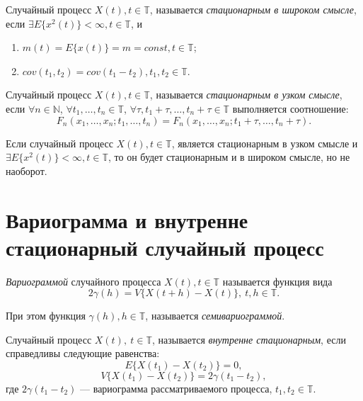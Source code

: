 \begin{Definition}
	Случайный процесс $ X (t), t \in \mathbb{T} $, называется \textit{стационарным в широком смысле}, если $ \exists E \{ x^2(t) \} < \infty, t \in \mathbb{T} $, и
	\begin{enumerate}
		\item $ m(t) = E \{ x(t) \} = m = const, t \in \mathbb{T} $;
		\item $ cov(t_1, t_2) = cov(t_1 - t_2), t_1,t_2 \in \mathbb{T} $.
	\end{enumerate}
\end{Definition}

\begin{Definition}
	Случайный процесс $ X(t), t \in \mathbb{T} $, называется \textit{стационарным в узком смысле}, если $ \forall n \in \mathbb{N} $, $ \forall t_1, \dots, t_n \in \mathbb{T} $, $ \forall \tau, t_1 + \tau, \dots, t_n + \tau \in \mathbb{T} $ выполняется соотношение:
	\begin{equation*}
		F_n(x_1, \dots, x_n; t_1, \dots, t_n) = F_n(x_1, \dots, x_n; t_1 + \tau , \dots, t_n + \tau).
	\end{equation*}
\end{Definition}

\begin{Remark}
	Если случайный процесс $ X(t), t \in \mathbb{T} $, является стационарным в узком смысле и $ \exists E \{ x^2(t) \} < \infty, t \in \mathbb{T} $, то он будет стационарным и в широком смысле, но не наоборот.
\end{Remark}

\section{Вариограмма и внутренне стационарный случайный процесс}
\label{sec:variogramAndInnerStationarity}
\begin{Definition}
    \textit{Вариограммой} случайного процесса $ X(t), t \in \mathbb{T} $ называется функция вида
	\begin{equation}
	    2 \gamma (h) = V \{ X(t + h) - X(t) \},~ t, h \in \mathbb{T}.
	\end{equation}

	При этом функция $ \gamma (h), h \in \mathbb{T} $, называется \textit{семивариограммой}.
\end{Definition}

\begin{Definition}
	Случайный процесс $ X(t),~ t \in \mathbb{T} $, называется \textit{внутренне стационарным}, если справедливы следующие равенства:
	\begin{equation}
		E \{ X(t_1) - X(t_2) \} = 0,
	\end{equation}
	\begin{equation}
	    V \{ X(t_1) - X(t_2) \} = 2 \gamma (t_1 - t_2),
	\end{equation}
	где $ 2 \gamma(t_1 - t_2) $ --- вариограмма рассматриваемого процесса, $ t_1, t_2 \in \mathbb{T} $.
\end{Definition}

